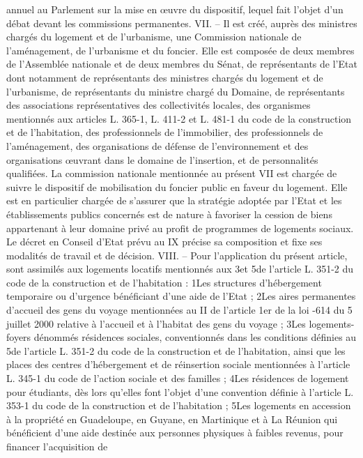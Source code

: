 \documentclass[11pt,a4paper]{report}
\begin{document}
	annuel au Parlement sur la mise en œuvre du dispositif, lequel fait l'objet d'un débat devant les commissions
	permanentes.
	VII. – Il est créé, auprès des ministres chargés du logement et de l'urbanisme, une Commission nationale de
	l'aménagement, de l'urbanisme et du foncier. Elle est composée de deux membres de l'Assemblée nationale et de
	deux membres du Sénat, de représentants de l'Etat dont notamment de représentants des ministres chargés du
	logement et de l'urbanisme, de représentants du ministre chargé du Domaine, de représentants des associations
	représentatives des collectivités locales, des organismes mentionnés aux articles L. 365-1, L. 411-2 et L. 481-1
	du code de la construction et de l'habitation, des professionnels de l'immobilier, des professionnels de
	l'aménagement, des organisations de défense de l'environnement et des organisations œuvrant dans le domaine
	de l'insertion, et de personnalités qualifiées.
	La commission nationale mentionnée au présent VII est chargée de suivre le dispositif de mobilisation du foncier
	public en faveur du logement. Elle est en particulier chargée de s'assurer que la stratégie adoptée par l'Etat et
	les établissements publics concernés est de nature à favoriser la cession de biens appartenant à leur domaine
	privé au profit de programmes de logements sociaux. Le décret en Conseil d'Etat prévu au IX précise sa
	composition et fixe ses modalités de travail et de décision.
	VIII. – Pour l'application du présent article, sont assimilés aux logements locatifs mentionnés aux 3\degre  et 5\degre  de
	l'article L. 351-2 du code de la construction et de l'habitation :
	1\degre  Les structures d'hébergement temporaire ou d'urgence bénéficiant d'une aide de l'Etat ;
	2\degre  Les aires permanentes d'accueil des gens du voyage mentionnées au II de l'article 1er de la loi -614
	du 5 juillet 2000 relative à l'accueil et à l'habitat des gens du voyage ;
	3\degre  Les logements-foyers dénommés résidences sociales, conventionnés dans les conditions définies au 5\degre  de
	l'article L. 351-2 du code de la construction et de l'habitation, ainsi que les places des centres d'hébergement et
	de réinsertion sociale mentionnées à l'article L. 345-1 du code de l'action sociale et des familles ;
	4\degre  Les résidences de logement pour étudiants, dès lors qu'elles font l'objet d'une convention définie à l'article L.
	353-1 du code de la construction et de l'habitation ;
	5\degre  Les logements en accession à la propriété en Guadeloupe, en Guyane, en Martinique et à La Réunion qui
	bénéficient d'une aide destinée aux personnes physiques à faibles revenus, pour financer l'acquisition de
\end{document}

